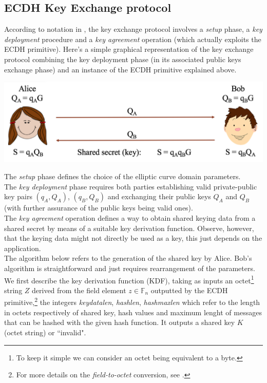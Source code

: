 \subsection{ECDH Key Exchange protocol}
According to notation in \cite{Sec}, the key exchange protocol involves a \textit{setup} phase, a \textit{key deployment} procedure and a \textit{key agreement} operation (which actually exploits the ECDH primitive).
Here's a simple graphical representation of the key exchange protocol combining the key deployment phase (in its associated public keys exchange phase) and an instance of the ECDH primitive explained above.
\begin{center}
	\includegraphics[scale = 0.55]{Images/ECDH.png}
	\label{fig:ECDH}
\end{center}
The \textit{setup} phase defines the choice of the elliptic curve domain parameters.\\
The \textit{key deployment} phase requires both parties establishing valid private-public key pairs $(q_A,Q_A)$, $(q_B,Q_B)$ and exchanging their public keys $Q_A$ and $Q_B$ (with further assurance of the public keys being valid ones).\\
The \textit{key agreement} operation defines a way to obtain shared keying data from a shared secret by means of a suitable key derivation function. Observe, however, that the keying data might not directly be used as a key, this just depends on the application.\\ The algorithm below refers to the generation of the shared key by Alice. Bob's algorithm is straightforward and just requires rearrangement of the parameters. We first describe the key derivation function (KDF), taking as inputs an octet\footnote{To keep it simple we can consider an octet being equivalent to a byte.} string $Z$ derived from the field element $z \in \mathbb{F}_n$ outputted by the ECDH primitive,\footnote{For more details on the \textit{field-to-octet} conversion, see \cite{Sec}.}
the integers \textit{keydatalen}, \textit{hashlen}, \textit{hashmaxlen} which refer to the length in octets respectively of shared key, hash values and maximum lenght of messages that can be hashed with the given hash function. It outputs a shared key $K$ (octet string) or ``invalid". 
